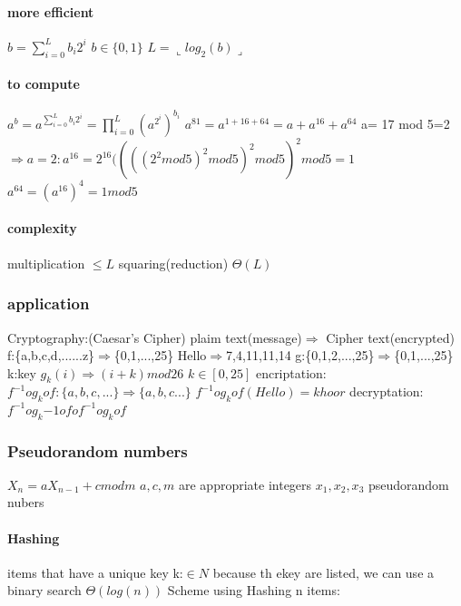 \documentclass[a4paper,10pt]{article}
\begin{document}
{\paragraph{more efficient}
$b=\sum_{i=0}^Lb_i2^i$ $b\in\{0,1\}$
\newline
$L=\llcorner log_2(b)\lrcorner$
\paragraph{to compute}
$a^b=a^{\sum_{i=0}^Lb_i2^i}=\prod_{i=0}^L(a^{2^i})^{b_i}$
\newline
$a^{81}=a^{1+16+64}=a+a^{16}+a^{64}$
\newline
a= 17 mod 5=2 $\Rightarrow a=2: a^{16}=2^{16}((((2^2mod5)^2mod5)^2mod5)^2mod5=1$
\newline
$a^{64}=(a^{16})^4=1mod5$
\paragraph{complexity}
multiplication $\leq L$ squaring(reduction) $\Theta(L)$
\subsubsection{application}
Cryptography:(Caesar's Cipher)
\newline
plaim text(message)$\Rightarrow$ Cipher text(encrypted)
\newline
f:\{a,b,c,d,......z\}$\Rightarrow$\{0,1,...,25\} Hello$\Rightarrow$7,4,11,11,14
\newline
g:\{0,1,2,...,25\}$\Rightarrow$\{0,1,...,25\}
\newline
k:key $g_k(i)\Rightarrow(i+k)mod26$
\newline
$k\in [0,25]$
\newline
encriptation: $f^{-1}og_kof:\{a,b,c,...\}\Rightarrow\{a,b,c...\}$
\newline
$f^{-1}og_kof(Hello)=khoor$
\newline 
decryptation:$f^{-1}og_k{-1}ofof^{-1}og_kof$
\subsubsection{Pseudorandom numbers}
$X_n=aX_{n-1}+c mod m$
\newline
$a,c,m$ are appropriate integers
\newline
$x_1,x_2,x_3$ pseudorandom nubers
\paragraph{Hashing}
items that have a unique key k:$\in N$ because th ekey are listed, we can use a binary search $\Theta(log(n))$
\newline
Scheme using Hashing n items:
}
\end{document}
